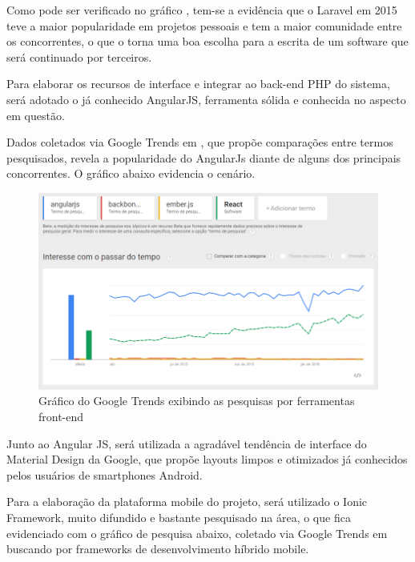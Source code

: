 Como pode ser verificado no gráfico \cite{WebhostFace-PHP-Frameworks}, tem-se a evidência que o Laravel em 2015 teve a maior popularidade em projetos pessoais e tem a maior comunidade entre os concorrentes, o que o torna uma boa escolha para a escrita de um software que será continuado por terceiros.


Para elaborar os recursos de interface e integrar ao back-end PHP do sistema, será adotado o já conhecido AngularJS, ferramenta sólida e conhecida no aspecto em questão. 


Dados coletados via Google Trends em \citealp{GoogleTrends-Front-end-Frameworks}, que propõe comparações entre termos pesquisados, revela a popularidade do AngularJs diante de alguns dos principais concorrentes. O gráfico abaixo evidencia o cenário.


\begin{figure}
	\label{fig:graficoGoogleTrendsFerramentasFront}
	\includegraphics[width=1\textwidth]{img/grafico_ferramentas_front}
	\caption{Gráfico do Google Trends exibindo as pesquisas por ferramentas front-end}
\end{figure}


Junto ao Angular JS, será utilizada a agradável tendência de interface do Material Design da Google, que propõe layouts limpos e otimizados já conhecidos pelos usuários de smartphones Android. 


Para a elaboração da plataforma mobile do projeto, será utilizado o Ionic Framework, muito difundido e bastante pesquisado na área, o que fica evidenciado com o gráfico de pesquisa abaixo, coletado via Google Trends em \cite{GoogleTrends-Mobile-hybrid-Frameworks} buscando por frameworks de desenvolvimento híbrido mobile.


